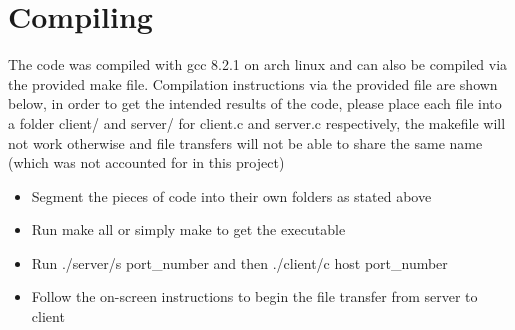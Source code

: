 \documentclass[11pt]{article}
\begin{document}
\section{Compiling}
The code was compiled with gcc 8.2.1 on arch linux and can also be compiled via the provided make file. Compilation instructions via the provided file are shown below, in order to get the intended results of the code, please place each file into a folder client/ and server/ for client.c and server.c respectively, the makefile will not work otherwise and file transfers will not be able to share the same name (which was not accounted for in this project)

\begin{itemize}
  \item Segment the pieces of code into their own folders as stated above
  \item Run make all or simply make to get the executable
  \item Run ./server/s port\_number and then ./client/c host port\_number
  \item Follow the on-screen instructions to begin the file transfer from server to client
\end{itemize}
\end{document}
